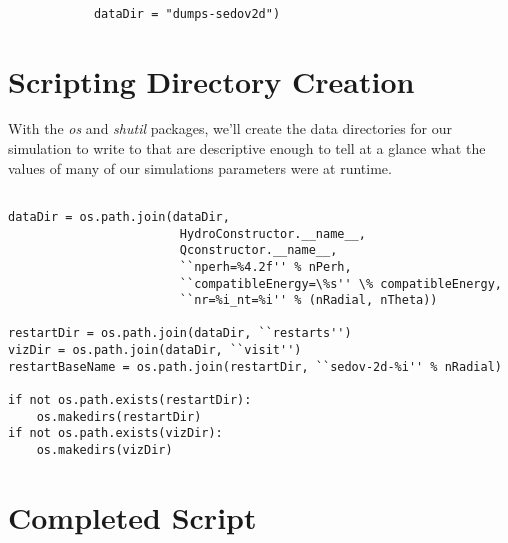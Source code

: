 \documentclass[11pt]{memoir}
\begin{document}
\begin{lstlisting}[firstnumber=last]

			dataDir = "dumps-sedov2d")
\end{lstlisting}

\section{Scripting Directory Creation}

With the \textit{os} and \textit{shutil} packages, we'll create the data directories for our simulation to write to that are descriptive enough to tell at a glance what the values of many of our simulations parameters were at runtime.

\begin{lstlisting}[firstnumber=last]

dataDir = os.path.join(dataDir,
						HydroConstructor.__name__,
						Qconstructor.__name__,
						``nperh=%4.2f'' % nPerh,
 						``compatibleEnergy=\%s'' \% compatibleEnergy,
						``nr=%i_nt=%i'' % (nRadial, nTheta))

restartDir = os.path.join(dataDir, ``restarts'')
vizDir = os.path.join(dataDir, ``visit'')
restartBaseName = os.path.join(restartDir, ``sedov-2d-%i'' % nRadial)
						
if not os.path.exists(restartDir):
	os.makedirs(restartDir)
if not os.path.exists(vizDir):
	os.makedirs(vizDir)
\end{lstlisting}

\section{Completed Script}
\end{document}
